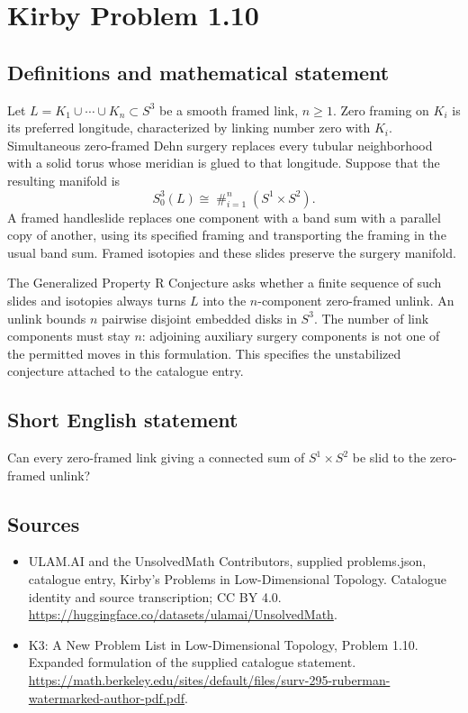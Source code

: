 \documentclass[11pt,a4paper]{article}
\begin{document}
\section*{Kirby Problem 1.10}\label{statement}

\subsection{Definitions and mathematical statement}
Let $L=K_1\cup\cdots\cup K_n\subset S^3$ be a smooth framed link, $n\geq1$.
Zero framing on $K_i$ is its preferred longitude, characterized by linking number
zero with $K_i$. Simultaneous zero-framed Dehn surgery replaces every tubular
neighborhood with a solid torus whose meridian is glued to that longitude.
Suppose that the resulting manifold is
\[
S^3_0(L)\cong\mathop{\#}_{i=1}^n(S^1\times S^2).
\]
A framed handleslide replaces one component with a band sum with a parallel
copy of another, using its specified framing and transporting the framing in
the usual band sum. Framed isotopies and these slides preserve the surgery
manifold.

The Generalized Property R Conjecture asks whether a finite sequence of such
slides and isotopies always turns $L$ into the $n$-component zero-framed unlink.
An unlink bounds $n$ pairwise disjoint embedded disks in $S^3$.
The number of link components must stay $n$: adjoining auxiliary surgery
components is not one of the permitted moves in this formulation. This specifies
the unstabilized conjecture attached to the catalogue entry.
\subsection{Short English statement}
Can every zero-framed link giving a connected sum of $S^1\times S^2$ be slid to the zero-framed unlink?
\subsection{Sources}
\begin{itemize}
\item[S1] ULAM.AI and the UnsolvedMath Contributors, supplied problems.json, catalogue entry, Kirby's Problems in Low-Dimensional Topology. Catalogue identity and source transcription; CC BY 4.0.
\url{https://huggingface.co/datasets/ulamai/UnsolvedMath}.
\item[S2] K3: A New Problem List in Low-Dimensional Topology, Problem 1.10. Expanded formulation of the supplied catalogue statement.
\url{https://math.berkeley.edu/sites/default/files/surv-295-ruberman-watermarked-author-pdf.pdf}.
\end{itemize}
\end{document}
